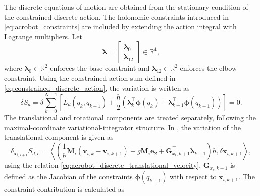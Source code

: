 The discrete equations of motion are obtained from the stationary condition of the
constrained discrete action. 
The holonomic constraints introduced in
\eqref{eq:acrobot_constraints} are included by extending the action integral with
Lagrange multipliers. Let
\begin{equation}
    \bm{\lambda}
    =
    \begin{bmatrix}
        \bm{\lambda}_{0} \\
        \bm{\lambda}_{12}
    \end{bmatrix}
    \in\mathbb{R}^{4},
    \label{eq:acrobot_lagrange_multipliers}
\end{equation}
where \(\bm{\lambda}_{0}\in\mathbb{R}^2\) enforces the base constraint and
\(\bm{\lambda}_{12}\in\mathbb{R}^2\) enforces the elbow constraint.
Using the constrained action sum defined in \eqref{eq:constrained_discrete_action}, the
variation is written as
\begin{equation}
    \delta S_{d}
    =
    \delta
    \sum_{k=0}^{N-1}
    \left[
    L_d(q_k,q_{k+1})
    +
    \frac{h}{2}
    \left(
    \bm{\lambda}_{k}^{\top}\bm{\phi}(q_k)
    +
    \bm{\lambda}_{k+1}^{\top}\bm{\phi}(q_{k+1})
    \right)
    \right]
    = 0.
    \label{eq:acrobot_variation_constrained_discrete_action}
\end{equation}
The translational and rotational components are treated separately, following the
maximal-coordinate variational-integrator structure. In \cite{BrudigamManchester2021VariationalIntegrators},
the variation of the translational component is given as
\begin{equation}
    \delta_{\bm{x}_{i,k+1}} S_{d,c}
    =
    \left\langle
    \left(\frac{1}{h}\bm{M}_i
    \left(
    \bm{v}_{i,k}
    -
    \bm{v}_{i,k+1}
    \right)
    +
    g\bm{M}_i\bm{e}_2
    +
    \bm{G}_{x_i,k+1}^{\top}\bm{\lambda}_{k+1}\right) h,
    \delta\bm{x}_{i,k+1}
    \right\rangle,
    \label{eq:acrobot_translational_variation}
\end{equation}
using the relation \eqref{eq:acrobot_discrete_translational_velocity}. $\bm{G}_{x_i,k+1}$ is defined as the Jacobian of the constraints $\bm{\phi}(q_{k+1})$ with respect to $\bm{x}_{i,k+1}$.
The constraint contribution is calculated as
